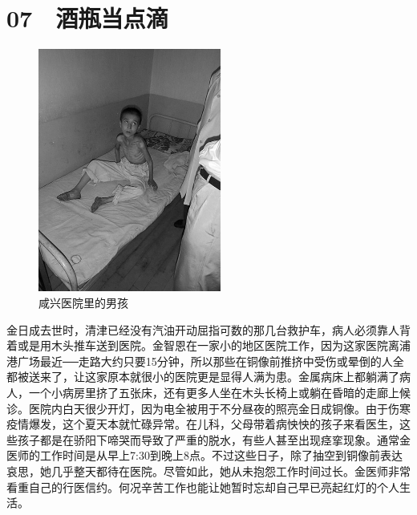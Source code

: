 \fancyhead[RO]{{\tiny{\textcolor{Gray}{\FA \ }}}\thepage}
\fancyhead[LE]{{\tiny{\textcolor{Gray}{\FA \ }}}\thepage}
\fancyfoot[LE,RO]{}
\fancyfoot[LO,CE]{}
\fancyfoot[CO,RE]{}
\chapter*{07 {\FA } 酒瓶当点滴}
\begin{figure}[!htbp]
	\centering
	\includegraphics[width=6cm]{./Chapters/Images/07.jpg}
	\caption*{咸兴医院里的男孩}
\end{figure}


金日成去世时，清津已经没有汽油开动屈指可数的那几台救护车，病人必须靠人背着或是用木头推车送到医院。金智恩在一家小的地区医院工作，因为这家医院离浦港广场最近──走路大约只要15分钟，所以那些在铜像前推挤中受伤或晕倒的人全都被送来了，让这家原本就很小的医院更是显得人满为患。金属病床上都躺满了病人，一个小病房里挤了五张床，还有更多人坐在木头长椅上或躺在昏暗的走廊上候诊。医院内白天很少开灯，因为电全被用于不分昼夜的照亮金日成铜像。由于伤寒疫情爆发，这个夏天本就忙碌异常。在儿科，父母带着病怏怏的孩子来看医生，这些孩子都是在骄阳下啼哭而导致了严重的脱水，有些人甚至出现痉挛现象。通常金医师的工作时间是从早上7:30到晚上8点。不过这些日子，除了抽空到铜像前表达哀思，她几乎整天都待在医院。尽管如此，她从未抱怨工作时间过长。金医师非常看重自己的行医信约。何况辛苦工作也能让她暂时忘却自己早已亮起红灯的个人生活。\\

